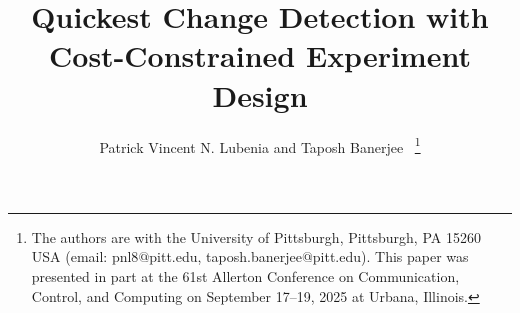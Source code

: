\documentclass[journal, onecolumn]{IEEEtran}
\begin{document}
%
\title{Quickest Change Detection with Cost-Constrained Experiment Design}
%
%
%

\author{Patrick Vincent N. Lubenia
        and Taposh Banerjee~\IEEEmembership{}%
\thanks{The authors are with the University of Pittsburgh, Pittsburgh, PA 15260 USA (email: pnl8$@$pitt.edu, taposh.banerjee$@$pitt.edu). This paper was presented in part at the 61st Allerton Conference on Communication, Control, and Computing on September 17--19, 2025 at Urbana, Illinois.}%
}

% 
%



% 
\end{document}
